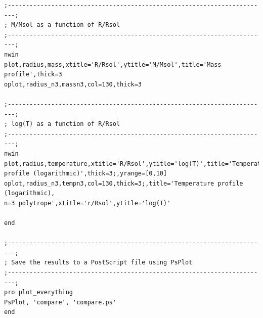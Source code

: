 \documentclass[a4paper,12pt]{article}
\begin{document}
\begin{itemize}
\begin{scriptsize}
\begin{verbatim}
;------------------------------------------------------------------------;
; M/Msol as a function of R/Rsol
;------------------------------------------------------------------------;
nwin
plot,radius,mass,xtitle='R/Rsol',ytitle='M/Msol',title='Mass profile',thick=3
oplot,radius_n3,massn3,col=130,thick=3

;------------------------------------------------------------------------;
; log(T) as a function of R/Rsol
;------------------------------------------------------------------------;
nwin
plot,radius,temperature,xtitle='R/Rsol',ytitle='log(T)',title='Temperature 
profile (logarithmic)',thick=3;,yrange=[0,10]
oplot,radius_n3,tempn3,col=130,thick=3;,title='Temperature profile (logarithmic), 
n=3 polytrope',xtitle='r/Rsol',ytitle='log(T)'

end

;------------------------------------------------------------------------;
; Save the results to a PostScript file using PsPlot
;------------------------------------------------------------------------;
pro plot_everything
PsPlot, 'compare', 'compare.ps'
end
\end{verbatim}
\end{scriptsize}

\end{itemize}
\end{document}
